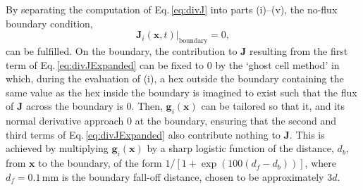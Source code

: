 \documentclass[9pt,lineno]{elife}
\newcommand{\MPtwo}[1]{\textcolor{revblue}{#1}}
\newcommand{\mb}[1]{\mathbf{#1}}
\begin{document}
By separating the computation of Eq.\,\ref{eq:divJ} into parts (i)--(v), the
no-flux boundary condition,
%
\begin{equation}
  \label{eq:noflux}
  \mb{J}_i(\mb{x},t)\big\rvert_{\mathrm{boundary}} = 0,
\end{equation}
%
can be fulfilled. On
the boundary, the contribution to $\mb{J}$ resulting from the first term of
Eq.\,\ref{eq:divJExpanded} can be fixed to 0 by the `ghost cell method' in
which, during the evaluation of (i), a hex outside the boundary containing the
same value as the hex inside the boundary is imagined to exist such that the
flux of $\mb{J}$ across the boundary is 0. Then, $\mb{g}_i(\mb{x})$ can be
tailored so that it, and its normal derivative approach 0 at the boundary,
ensuring that the second and third terms of Eq.\,\ref{eq:divJExpanded} also
contribute nothing to $\mb{J}$. This is achieved by \MPtwo{multiplying}
$\mb{g}_i(\mb{x})$ \MPtwo{by} a sharp logistic function of the distance, $d_b$,
from $\mb{x}$ to the boundary, \MPtwo{of the form $1/[1 +
  \exp(100(d_f-d_b))]$, where $d_f=0.1$\,mm is the boundary fall-off distance,
  chosen to be approximately $3d$}.
\end{document}
